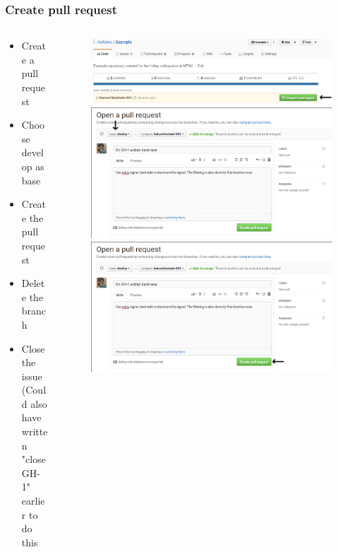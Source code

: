 \begin{frame}
	\frametitle{Create pull request}
	\begin{columns}
		\begin{column}{0.4\textwidth}
			\begin{itemize}[<+->]
				\item Create a pull request
				\item Choose develop as base
				\item Create the pull request
				\item Delete the branch
				\item Close the issue (Could also have written "close GH-1" earlier to do this
			\end{itemize}
		\end{column}
		\begin{column}{0.6\textwidth}
			\begin{figure}
				\centering
				\begin{overprint}
					\includegraphics[width=\textwidth]{./pictures/compare_and_pull.png}
					\onslide<2>\includegraphics[width=\textwidth]{./pictures/base_develop.png}
					\onslide<3>\includegraphics[width=\textwidth]{./pictures/create_pull.png}

\end{overprint}
\end{figure}
\end{column}
\end{columns}
\end{frame}
